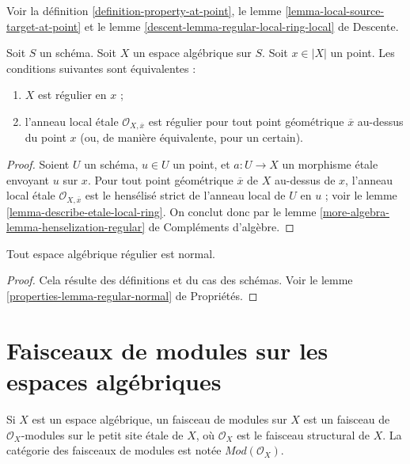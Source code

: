 \noindent
Voir la définition \ref{definition-property-at-point}, le
lemme \ref{lemma-local-source-target-at-point} et le
lemme \ref{descent-lemma-regular-local-ring-local} de Descente.

\begin{lemma}
\label{lemma-regular-at-x}
Soit $S$ un schéma. Soit $X$ un espace algébrique sur $S$.
Soit $x \in |X|$ un point. Les conditions suivantes sont équivalentes :
\begin{enumerate}
\item $X$ est régulier en $x$ ;
\item l'anneau local \'etale $\mathcal{O}_{X, \overline{x}}$ est
régulier pour tout point géométrique $\overline{x}$ au-dessus du point
$x$ (ou, de manière équivalente, pour un certain).
\end{enumerate}
\end{lemma}

\begin{proof}
Soient $U$ un schéma, $u \in U$ un point, et $a : U \to X$ un
morphisme \'etale envoyant $u$ sur $x$. Pour tout point géométrique
$\overline{x}$ de $X$ au-dessus de $x$, l'anneau local \'etale
$\mathcal{O}_{X, \overline{x}}$ est le hensélisé strict de
l'anneau local de $U$ en $u$ ; voir le
lemme \ref{lemma-describe-etale-local-ring}.
On conclut donc par le
lemme \ref{more-algebra-lemma-henselization-regular} de Compléments d'algèbre.
\end{proof}

\begin{lemma}
\label{lemma-regular-normal}
Tout espace algébrique régulier est normal.
\end{lemma}

\begin{proof}
Cela résulte des définitions et du cas des schémas.
Voir le lemme \ref{properties-lemma-regular-normal} de Propriétés.
\end{proof}

 








\section{Faisceaux de modules sur les espaces algébriques}
\label{section-modules}

\noindent
Si $X$ est un espace algébrique, un faisceau de modules sur $X$ est
un faisceau de $\mathcal{O}_X$-modules sur le petit site \'etale de $X$,
où $\mathcal{O}_X$ est le faisceau structural de $X$. La catégorie
des faisceaux de modules est notée $\textit{Mod}(\mathcal{O}_X)$.

